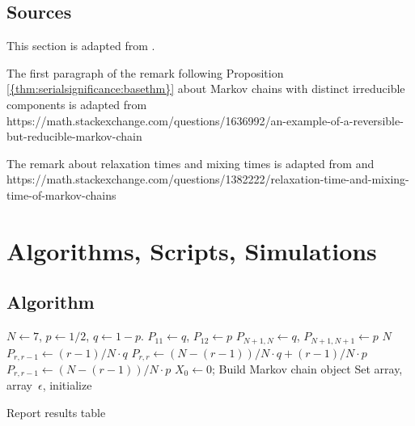 \documentclass[12pt]{article}
\begin{document}
\subsection*{Sources} This section is adapted from
\cite{Chikina2860, Chikina2019, doi:10.1080/2330443X.2020.1806763}.

The first paragraph of the remark following Proposition~%
\ref{{thm:serialsignificance:basethm}} about Markov chains with distinct
irreducible components is adapted from
https://math.stackexchange.com/questions/1636992/an-example-of-a-reversible-but-reducible-markov-chain

The remark about relaxation times and mixing times is adapted from
\cite{levin09} and
https://math.stackexchange.com/questions/1382222/relaxation-time-and-mixing-time-of-markov-chains

\hr

\section*{Algorithms, Scripts, Simulations}

\subsection*{Algorithm}

\begin{algorithm}[H]
     
      
     

     \BlankLine \( N \leftarrow 7 \), \( p \leftarrow 1/2 \),
    \( q \leftarrow 1-p \).\;  \( P_{11} \leftarrow q \), \( P_{12}
    \leftarrow p \)\; \( P_{N+1,N} \leftarrow q \), \( P_{N+1, N+1}
    \leftarrow p \)\;  \KwTo \( N \){ \( P_{r,r-1}
    \leftarrow (r-1)/N \cdot q \)\; \( P_{r,r} \leftarrow (N-(r-1))/N
    \cdot q + (r-1)/N \cdot p \)\; \( P_{r,r-1} \leftarrow (N-(r-1))/N
    \cdot p \)\; }  \( X_0
    \leftarrow 0 \); Build Markov chain object\; \BlankLine Set \pL
    array, \nT array\, \( \epsilon \), initialize \res

     Report results table\;
\end{algorithm}
\end{document}
